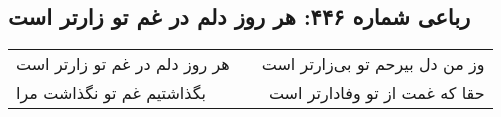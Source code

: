 \begin{center}
\section*{رباعی شماره ۴۴۶: هر روز دلم در غم تو زارتر است}
\label{sec:0446}
\begin{longtable}{l p{0.5cm} r}
هر روز دلم در غم تو زارتر است
&&
وز من دل بیرحم تو بی‌زارتر است
\\
بگذاشتیم غم تو نگذاشت مرا
&&
حقا که غمت از تو وفادارتر است
\\
\end{longtable}
\end{center}
